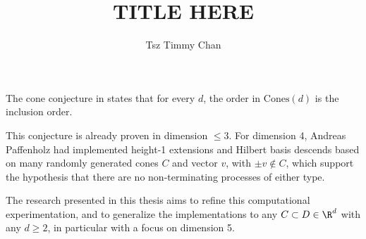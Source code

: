\documentclass{TC}
\title{TITLE HERE}	%
\author{Tsz Timmy Chan}	%
\begin{document}

The cone conjecture in \cite{GubeladzePosetCones} states that for every $d$, the order in $\mathrm{Cones}(d)$ is the inclusion order.

This conjecture is already proven in dimension $\leq 3$. For dimension 4, Andreas Paffenholz had implemented height-1 extensions and Hilbert basis  descends based on many randomly generated cones $C$ and vector $v$, with $\pm v \notin C$, which support the hypothesis that there are no non-terminating processes of either type.

The research presented in this thesis aims to refine this computational experimentation, and to generalize the implementations to any $C \subset D \in \R^d$ with any $d \geq 2$, in particular with a focus on dimension 5. 
\end{document}
